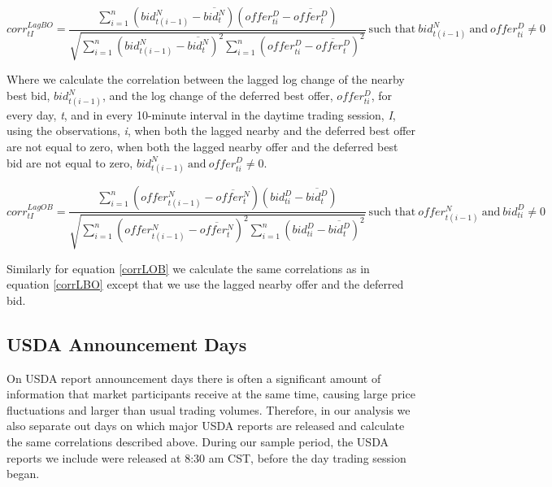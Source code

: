 \documentclass[]{elsarticle} %
\begin{document}
\begin{equation} \label{corrLBO}
corr^{LagBO}_{tI} = \frac{\sum\limits_{i=1}^{n} \left(bid_{t(i-1)}^N - \overline{bid_t^N}\right) \left(offer_{ti}^D - \overline{offer_t^D}\right)}{\sqrt{\sum\limits_{i=1}^{n} \left(bid_{t(i-1)}^N - \overline{bid_t^N}\right)^2 \sum\limits_{i=1}^{n}\left(offer_{ti}^D - \overline{offer_t^D}\right)^2}} \: \textrm{such that} \: {bid_{t(i-1)}^N \: \textrm{and} \: offer_{ti}^D} \neq 0
\end{equation}

Where we calculate the correlation between the lagged log change of the
nearby best bid, \(bid_{t(i-1)}^N\), and the log change of the deferred
best offer, \(offer_{ti}^D\), for every day, \emph{t}, and in every
10-minute interval in the daytime trading session, \emph{I}, using the
observations, \emph{i}, when both the lagged nearby and the deferred
best offer are not equal to zero, when both the lagged nearby offer and
the deferred best bid are not equal to zero,
\({bid_{t(i-1)}^N \: \textrm{and} \: offer_{ti}^D} \neq 0\).

\begin{equation} \label{corrLOB}
corr^{LagOB}_{tI} = \frac{\sum\limits_{i=1}^{n} \left(offer_{t(i-1)}^N - \overline{offer_t^N}\right) \left(bid_{ti}^D - \overline{bid_t^D}\right)}{\sqrt{\sum\limits_{i=1}^{n} \left(offer_{t(i-1)}^N - \overline{offer_t^N}\right)^2 \sum\limits_{i=1}^{n}\left(bid_{ti}^D - \overline{bid_t^D}\right)^2}} \: \textrm{such that} \: {offer_{t(i-1)}^N \: \textrm{and} \: bid_{ti}^D} \neq 0
\end{equation}

Similarly for equation \ref{corrLOB} we calculate the same correlations
as in equation \ref{corrLBO} except that we use the lagged nearby offer
and the deferred bid.

\subsection{USDA Announcement Days}\label{usda-announcement-days}

On USDA report announcement days there is often a significant amount of
information that market participants receive at the same time, causing
large price fluctuations and larger than usual trading volumes.
Therefore, in our analysis we also separate out days on which major USDA
reports are released and calculate the same correlations described
above. During our sample period, the USDA reports we include were
released at 8:30 am CST, before the day trading session began.
\end{document}
